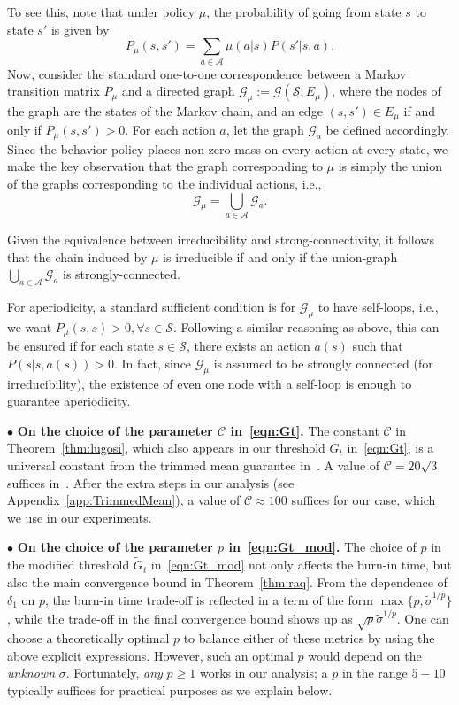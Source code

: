 \documentclass{article}
\newcommand{\mc}{\mathcal}
\begin{document}
To see this, note that under policy $\mu$, the probability of going from state $s$ to state $s'$ is given by
$$ P_{\mu}(s,s') = \sum_{a \in \mc{A}} \mu(a|s) P(s'|s, a).$$
Now, consider the standard one-to-one correspondence between a Markov transition matrix $P_{\mu}$ and a directed graph $\mc{G}_{\mu}:= \mc{G}(\mc{S},E_{\mu})$, where the nodes of the graph are the states of the Markov chain, and an edge $(s,s') \in E_{\mu}$ if and only if $P_{\mu}(s,s') >0.$ For each action $a$, let the graph $\mc{G}_a$ be defined accordingly. Since the behavior policy places non-zero mass on every action at every state, we make the key observation that the graph corresponding to $\mu$ is simply the union of the graphs corresponding to the individual actions, i.e.,
$$ \mc{G}_{\mu} = \bigcup_{a \in \mc{A}} \mc{G}_a.$$

Given the equivalence between irreducibility and strong-connectivity, it follows that the chain induced by $\mu$ is irreducible if and only if the union-graph $\bigcup_{a \in \mc{A}} \mc{G}_a$ is strongly-connected. 

For aperiodicity, a standard sufficient condition is for $\mc{G}_{\mu}$ to have self-loops, i.e., we want $P_{\mu}(s,s) > 0, \forall s \in \mc{S}$. Following a similar reasoning as above, this can be ensured if for each state $s \in \mc{S}$, there exists an action $a(s)$ such that $P(s| s, a(s)) >0.$ In fact, since $\mc{G}_{\mu}$ is assumed to be strongly connected (for irreducibility), the existence of even one node with a self-loop is enough to guarantee aperiodicity. 

$\bullet$ \textbf{On the choice of the parameter $\mc{C}$ in~\eqref{eqn:Gt}.} The constant $\mc{C}$ in Theorem~\ref{thm:lugosi}, which also appears in our threshold $G_t$ in~\eqref{eqn:Gt}, is a universal constant from the trimmed mean guarantee in~\citet{lugosi}. A value of $\mc{C} = 20 \sqrt{3}$ suffices in~\citet{lugosi}. After the extra steps in our analysis (see Appendix~\ref{app:TrimmedMean}), a value of $\mc{C} \approx 100$ suffices for our case, which we use in our experiments. 

$\bullet$ \textbf{On the choice of the parameter $p$ in~\eqref{eqn:Gt_mod}.} The choice of $p$ in the modified threshold $\tilde{G}_t$ in~\eqref{eqn:Gt_mod} not only affects the burn-in time, but also the main convergence bound in Theorem~\ref{thm:raq}. From the dependence of $\delta_1$ on $p$, the burn-in time trade-off is reflected in a term of the form $\max\{p, \tilde{\sigma}^{1/p}\}$, while the trade-off in the final convergence bound shows up as $\sqrt{p} \tilde{\sigma}^{1/p}$. One can choose a theoretically optimal $p$ to balance either of these metrics by using the above explicit expressions. However, such an optimal $p$ would depend on the \emph{unknown} $\tilde{\sigma}$. Fortunately, \emph{any} $p \geq 1$ works in our analysis; a $p$ in the range $5-10$ typically suffices for practical purposes as we explain below. 
\end{document}
